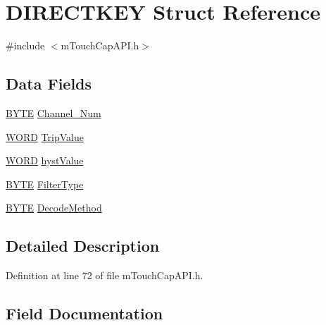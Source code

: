 \hypertarget{struct_d_i_r_e_c_t_k_e_y}{}\section{D\+I\+R\+E\+C\+T\+K\+E\+Y Struct Reference}
\label{struct_d_i_r_e_c_t_k_e_y}


{\ttfamily \#include $<$m\+Touch\+Cap\+A\+P\+I.\+h$>$}

\subsection*{Data Fields}
\begin{DoxyCompactItemize}
\item 
\hyperlink{_generic_type_defs_8h_a4ae1dab0fb4b072a66584546209e7d58}{B\+Y\+T\+E} \hyperlink{struct_d_i_r_e_c_t_k_e_y_a721a327a1eadc121c365ecfca898972d}{Channel\+\_\+\+Num}
\item 
\hyperlink{_generic_type_defs_8h_a2b0e863dadf920709ec53d9088ee7c91}{W\+O\+R\+D} \hyperlink{struct_d_i_r_e_c_t_k_e_y_abc6bec2968b498197fc0e64c3729fb0c}{Trip\+Value}
\item 
\hyperlink{_generic_type_defs_8h_a2b0e863dadf920709ec53d9088ee7c91}{W\+O\+R\+D} \hyperlink{struct_d_i_r_e_c_t_k_e_y_aee26e696540c8197e148cb9f0ccd4551}{hyst\+Value}
\item 
\hyperlink{_generic_type_defs_8h_a4ae1dab0fb4b072a66584546209e7d58}{B\+Y\+T\+E} \hyperlink{struct_d_i_r_e_c_t_k_e_y_a3ed3b2bb276c531333666858f705a254}{Filter\+Type}
\item 
\hyperlink{_generic_type_defs_8h_a4ae1dab0fb4b072a66584546209e7d58}{B\+Y\+T\+E} \hyperlink{struct_d_i_r_e_c_t_k_e_y_a3ec50eb50f016432fd63460deb50d4d3}{Decode\+Method}
\end{DoxyCompactItemize}


\subsection{Detailed Description}


Definition at line 72 of file m\+Touch\+Cap\+A\+P\+I.\+h.



\subsection{Field Documentation}
\hypertarget{struct_d_i_r_e_c_t_k_e_y_a721a327a1eadc121c365ecfca898972d}{}
